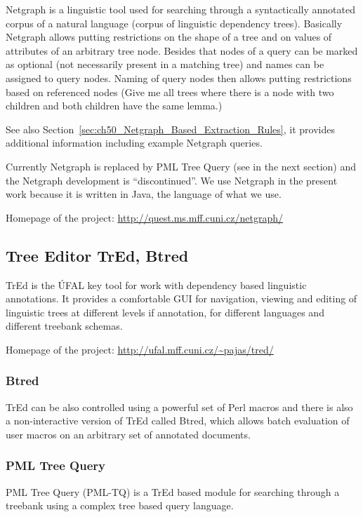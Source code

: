 Netgraph \citep{biblio:MiNetgraphA2006} is a linguistic tool used for searching through a syntactically annotated corpus of a natural language (corpus of linguistic dependency trees). Basically Netgraph allows putting restrictions on the shape of a tree and on values of attributes of an arbitrary tree node. Besides that nodes of a query can be marked as optional (not necessarily present in a matching tree) and names can be assigned to query nodes. Naming of query nodes then allows putting restrictions based on referenced nodes (Give me all trees where there is a node with two children and both children have the same lemma.)

See also Section~\ref{sec:ch50_Netgraph_Based_Extraction_Rules}, it provides additional information including example Netgraph queries.

Currently Netgraph is replaced by PML Tree Query (see in the next section) and the Netgraph development is ``discontinued''. We use Netgraph in the present work because it is written in Java, the language of what we use.

Homepage of the project: \url{http://quest.ms.mff.cuni.cz/netgraph/}


\subsection{Tree Editor TrEd, Btred}

TrEd is the ÚFAL key tool for work with dependency based linguistic annotations. It provides a comfortable GUI for navigation, viewing and editing of linguistic trees at different levels if annotation, for different languages and different treebank schemas. 

Homepage of the project: \url{http://ufal.mff.cuni.cz/~pajas/tred/}


\subsubsection{Btred}
TrEd can be also controlled using a powerful set of Perl macros and there is also a non-interactive version of TrEd called Btred, which allows batch evaluation of user macros on an arbitrary set of annotated documents.

\subsubsection{PML Tree Query}
PML Tree Query (PML-TQ) \citep{biblio:PaStSystemfor2009} is a TrEd based module for searching through a treebank using a complex tree based query language.

